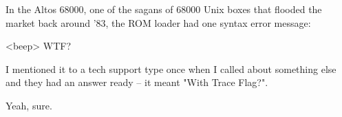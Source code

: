 \begin{new}

	\begin{usenet}
		In the Altos 68000, one of the sagans of 68000 Unix boxes that flooded
		the market back around '83, the ROM loader had one syntax error message:

		\begin{usenet}
			<beep> WTF?
		\end{usenet}

		I mentioned it to a tech support type once when I called about something
		else and they had an answer ready -- it meant "With Trace Flag?".

		Yeah, sure.
	\end{usenet}
\end{new}

